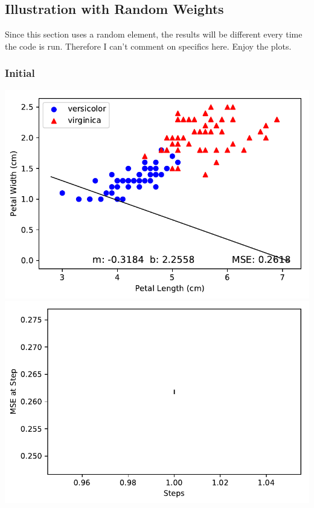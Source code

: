 \documentclass[letterpaper]{article}
\begin{document}
\subsection{Illustration with Random Weights}

Since this section uses a random element, the results will be different
every time the code is run. Therefore I can't comment on specifics here.
Enjoy the plots.
\subsubsection{Initial}
\begin{center}
\includegraphics{plot_3c_1.pdf}
\includegraphics{plot_3c_2.pdf}
\end{center}
\end{document}
